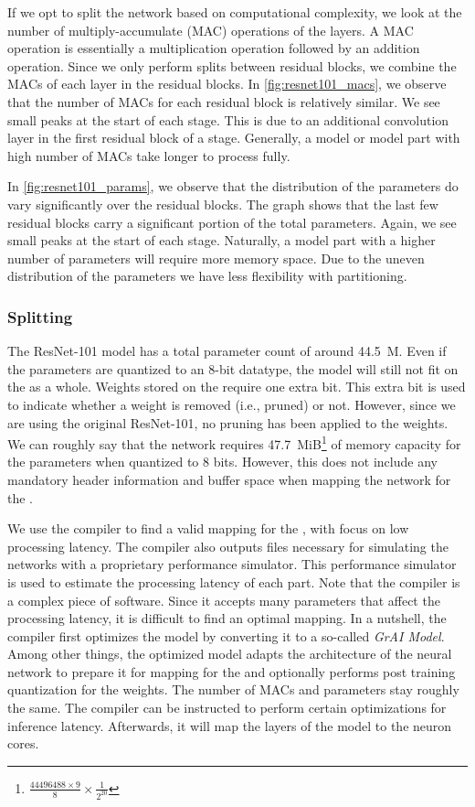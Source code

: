 If we opt to split the network based on computational complexity, we look at the number of multiply-accumulate (MAC) operations of the layers.
A MAC operation is essentially a multiplication operation followed by an addition operation.
Since we only perform splits between residual blocks, we combine the MACs of each layer in the residual blocks.
In \cref{fig:resnet101_macs}, we observe that the number of MACs for each residual block is relatively similar.
We see small peaks at the start of each stage.
This is due to an additional convolution layer in the first residual block of a stage.
Generally, a model or model part with high number of MACs take longer to process fully.

In \cref{fig:resnet101_params}, we observe that the distribution of the parameters do vary significantly over the residual blocks.
The graph shows that the last few residual blocks carry a significant portion of the total parameters.
Again, we see small peaks at the start of each stage.
Naturally, a model part with a higher number of parameters will require more memory space.
Due to the uneven distribution of the parameters we have less flexibility with partitioning. 

\subsubsection{Splitting}
The ResNet-101 model has a total parameter count of around \SI{44.5}{M}.
Even if the parameters are quantized to an 8-bit datatype, the model will still not fit on the \graicore{} as a whole.
Weights stored on the \graicore{} require one extra bit.
This extra bit is used to indicate whether a weight is removed (i.e., pruned) or not.
However, since we are using the original ResNet-101, no pruning has been applied to the weights.
We can roughly say that the network requires \SI{47.7}{MiB}\footnote{$\frac{\num{44496488} \times 9}{8} \times \frac{1}{2^{20}}$} of memory capacity for the parameters when quantized to 8 bits.
However, this does not include any mandatory header information and buffer space when mapping the network for the \graicore{}. 

We use the compiler to find a valid mapping for the \graicore{}, with focus on low processing latency.
The compiler also outputs files necessary for simulating the networks with a proprietary performance simulator.
This performance simulator is used to estimate the processing latency of each part.
Note that the compiler is a complex piece of software.
Since it accepts many parameters that affect the processing latency, it is difficult to find an optimal mapping. 
In a nutshell, the compiler first optimizes the model by converting it to a so-called \textit{GrAI Model}.
Among other things, the optimized model adapts the architecture of the neural network to prepare it for mapping for the \graicore{} and optionally performs post training quantization \autocite{krishnamoorthiQuantizingDeepConvolutional2018} for the weights.
The number of MACs and parameters stay roughly the same.
The compiler can be instructed to perform certain optimizations for inference latency.
Afterwards, it will map the layers of the model to the neuron cores.

